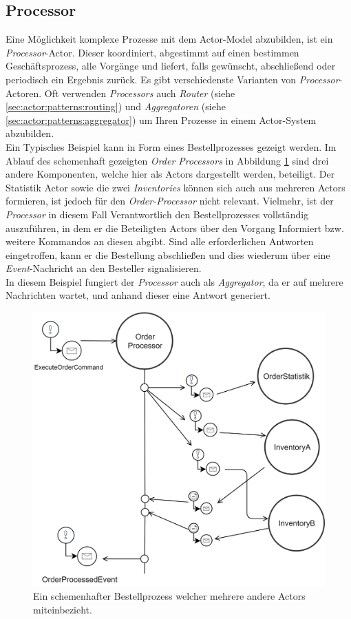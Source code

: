 \subsection{Processor}\label{sub:actor:patterns:processor}
Eine Möglichkeit komplexe Prozesse mit dem Actor-Model abzubilden, ist ein \textit{Processor}-Actor. Dieser koordiniert, abgestimmt auf einen bestimmen Geschäftsprozess, alle Vorgänge und liefert, falls gewünscht, abschließend oder periodisch ein Ergebnis zurück. Es gibt verschiedenste Varianten von \textit{Processor}-Actoren. \citep{Vernon2015ReactiveAkka}
Oft verwenden \textit{Processors} auch \textit{Router} (siehe \ref{sec:actor:patterns:routing}) und \textit{Aggregatoren} (siehe \ref{sec:actor:patterns:aggregator}) um Ihren Prozesse in einem Actor-System abzubilden. \\
Ein Typisches Beispiel kann in Form eines Bestellprozesses gezeigt werden. Im Ablauf des schemenhaft gezeigten \textit{Order Processors} in Abbildung \ref{fig:actor:patterns:orderProcesseor} sind drei andere Komponenten, welche hier als Actors dargestellt werden, beteiligt. Der Statistik Actor sowie die zwei \textit{Inventories} können sich auch aus mehreren Actors formieren, ist jedoch für den \textit{Order-Processor} nicht relevant. Vielmehr, ist der \textit{Processor} in diesem Fall Verantwortlich den Bestellprozesses vollständig auszuführen, in dem er die Beteiligten Actors über den Vorgang Informiert bzw. weitere Kommandos an diesen abgibt. Sind alle erforderlichen Antworten eingetroffen, kann er die Bestellung abschließen und dies wiederum über eine \textit{Event}-Nachricht an den Besteller signalisieren. \\
In diesem Beispiel fungiert der \textit{Processor} auch als \textit{Aggregator}, da er auf mehrere Nachrichten wartet, und anhand dieser eine Antwort generiert. 

\begin{figure}
    \centering
    \includegraphics[width=0.9\linewidth]{gfx/actor/patterns/simpleOrderProcesor}
    \caption{Ein schemenhafter Bestellprozess welcher mehrere andere Actors miteinbezieht.}
    \label{fig:actor:patterns:orderProcesseor}
\end{figure}

